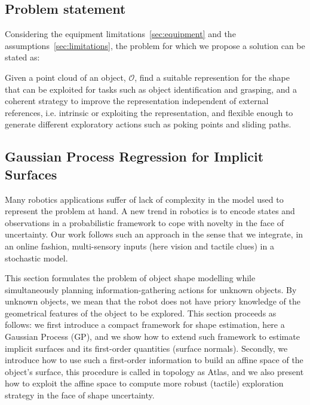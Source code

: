 \subsection{Problem statement}
\label{sec:problem}

Considering the equipment limitations~\ref{sec:equipment} and the assumptions~\ref{sec:limitations}, the problem for which we propose a solution can be stated as:

Given a point cloud of an object, $\mathcal{O}$, find a suitable represention for the shape that can be exploited for tasks such as object identification and grasping, and a coherent strategy to improve the representation independent of external references, i.e. intrinsic or exploiting the representation, and flexible enough to generate different exploratory actions such as poking points and sliding paths.


\subsection{Gaussian Process Regression for Implicit Surfaces}
\label{sec:gpr}

Many robotics applications suffer of lack of complexity in the model used to represent the problem at hand. A new trend in robotics is to encode states and observations in a probabilistic framework to cope with novelty in the face of uncertainty. Our work follows such an approach in the sense that we integrate, in an online fashion, multi-sensory inputs (here vision and tactile clues) in a stochastic model.

This section formulates the problem of object shape modelling while simultaneously planning information-gathering actions for unknown objects. By unknown objects, we mean that the robot does not have priory knowledge of the geometrical features of the object to be explored.  This section proceeds as follows: we first introduce a compact framework for shape estimation, here a Gaussian Process (GP), and we show how to extend such framework to estimate implicit surfaces and its first-order quantities (surface normals). Secondly, we introduce how to use such a first-order information to build an affine space of the object's surface, this procedure is called in topology as Atlas, and we also present how to exploit the affine space to compute more robust (tactile) exploration strategy in the face of shape uncertainty. 

